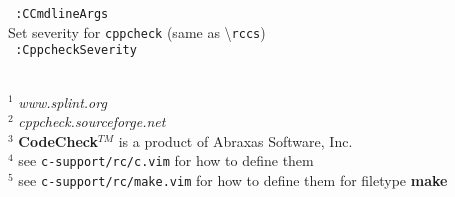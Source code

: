 \documentclass[oneside,11pt,landscape,DIV16]{scrartcl}
\begin{document}
\begin{multicols}{3}
\begin{center}
\begin{flushleft}
\texttt{ :CCmdlineArgs}\\[1.0ex]
%
Set severity for \texttt{cppcheck} (same as \textbackslash\texttt{rccs})\\[1.0ex]
\texttt{ :CppcheckSeverity}\\[1.0ex]
%
\vfill
\begin{minipage}[b]{65mm}%
%
\scriptsize{%
\hrulefill\\
$^1$ \textit{www.splint.org}\\
$^2$ \textit{cppcheck.sourceforge.net}\\
$^3$ \textbf{CodeCheck}$^{TM}$ is a product of Abraxas Software, Inc.\\
$^4$ see \verb'c-support/rc/c.vim' for how to define them \\
$^5$ see \verb'c-support/rc/make.vim' for how to define them for filetype \textbf{make}
}%
%
\end{minipage}
%
\end{flushleft}
%
\end{center}
\end{multicols}
\end{document}
